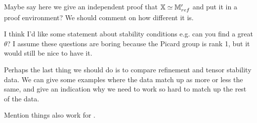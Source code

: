 \documentclass[12pt]{amsart}
\begin{document}
{\red Maybe say here we give an independent proof that $\mathbb{X} \simeq \mathbb{M}'_{ref}$ and put it in a proof environment? We should comment on how different it is.}

{\red I think I'd like some statement about stability conditions e.g. can you find a great $\theta$? I assume these questions are boring because the Picard group is rank 1, but it would still be nice to have it.}

{\red Perhaps the last thing we should do is to compare refinement and tensor stability data. We can give some examples where the data match up as more or less the same, and give an indication why we need to work so hard to match up the rest of the data.}

{\red Mention things also work for \cite{C17}.}



\end{document}
